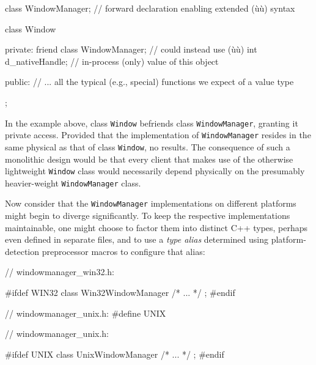 \begin{emcppslisting}
class WindowManager;  // forward declaration enabling extended (ù{}ù) syntax

class Window
{
private:
    friend class WindowManager;  // could instead use (ù{}ù)
    int d_nativeHandle;          // in-process (only) value of this object

public:
    // ... all the typical (e.g., special) functions we expect of a value type
};
\end{emcppslisting}

\noindent In the example above, class \lstinline!Window! befriends class
\lstinline!WindowManager!, granting it private access. Provided that the
implementation of \lstinline!WindowManager! resides in the same physical
 as that of class \lstinline!Window!, no
 results. The consequence of such a
monolithic design would be that every client that makes use of the
otherwise lightweight \lstinline!Window! class would necessarily depend
physically on the presumably heavier-weight \lstinline!WindowManager! class.

Now consider that the \lstinline!WindowManager! implementations on
different platforms might begin to diverge significantly. To keep the
respective implementations maintainable, one might choose to factor them
into distinct C++ types, perhaps even defined in separate files, and to
use a \emph{type alias} determined using platform-detection preprocessor
macros to configure that alias:


\begin{emcppslisting}[emcppsbatch=e1]
// windowmanager_win32.h:

#ifdef WIN32
class Win32WindowManager { /* ... */ };
#endif
\end{emcppslisting}

\vspace*{2ex}

\begin{emcppshiddenlisting}[emcppsbatch=e1]
// windowmanager_unix.h:
#define UNIX
\end{emcppshiddenlisting}
\begin{emcppslisting}[emcppsbatch=e1]
// windowmanager_unix.h:

#ifdef UNIX
class UnixWindowManager { /* ... */ };
#endif
\end{emcppslisting}

